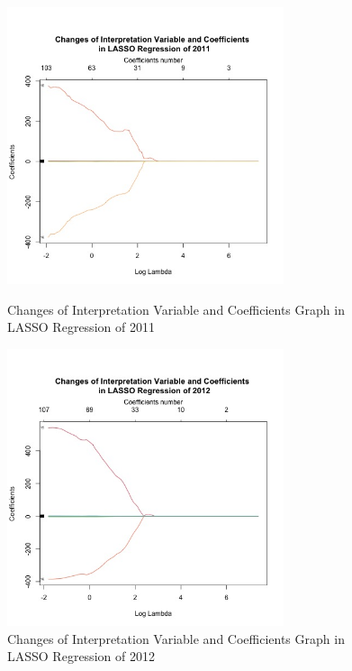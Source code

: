 \documentclass{mcmthesis}
\begin{document}
\begin{appendices}
\begin{figure}[H]
\centering
\begin{minipage}[t]{0.45\textwidth}
\centering
\includegraphics[width=3.2in]{figures/ChangesofInterpretationVariableandCoefficientsinLASSORegressionof2011.jpeg}
\caption{Changes of Interpretation Variable and Coefficients Graph in LASSO Regression of 2011}
\label{Changes of Interpretation Variable and Coefficients Graph in LASSO Regression of 2011}
\end{minipage}
\hfill
\begin{minipage}[t]{0.45\textwidth}
\centering
\includegraphics[width=3.2in]{figures/ChangesofInterpretationVariableandCoefficientsinLASSORegressionof2012.jpeg}
\caption{Changes of Interpretation Variable and Coefficients Graph in LASSO Regression of 2012}
\label{Changes of Interpretation Variable and Coefficients Graph in LASSO Regression of 2012}
\end{minipage}
\end{figure}


\end{appendices}
\end{document}
